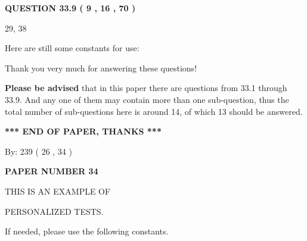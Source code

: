 \documentclass[12pt]{article}
\begin{document}
 
 
  
\vspace{0.2in}
  
{\textbf{\Large{QUESTION
33.9 
 (           9 ,          16 ,          70 )
}}}
  
  


 
 
\noindent{}

29,  %
38
 
 
 
   
   
 \vspace{0.2in}
Here are still some constants for use:
 
 
 
 
Thank you very much for answering these questions!
 
{\textbf{\large{Please be advised}}} that in this paper there are questions from
33.1 through
33.9.
And any one of them may contain more than one sub-question, thus the total number
of sub-questions here is around 14, of which
13 should be answered.
 
   
   
   
   
\vspace{1.0in} 
{\textbf{\large{ *** END OF PAPER, THANKS *** }}} 
   
   
\hspace{1.0in} By: 
         239 (          26 ,           34 )
   
   
   
   
\newpage 
\setcounter{page}{ 
    34001 } 
   
   
   
   
 {\textbf{ \Large{ PAPER NUMBER           34  }}}
   
   
\vspace{0.2in}
   
   
   
   
   
   
 \vspace{0.2in}
 
 
{\Huge  THIS IS AN EXAMPLE OF}
 
{\Huge  PERSONALIZED TESTS. }
 
If needed, please use the following constants.
 
 
 
\end{document}

